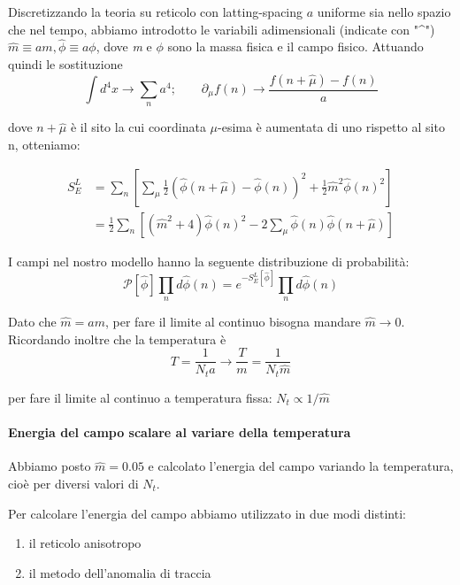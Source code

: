 \documentclass[a4paper, 12pt]{article}
\begin{document}
Discretizzando la teoria su reticolo con latting-spacing $a$ uniforme sia
nello spazio che nel tempo, abbiamo introdotto le variabili adimensionali
(indicate con "\^{}") $\hat{m} \equiv am, \hat{\phi} \equiv a \phi$,
dove \emph{m} e $\phi$ sono la massa fisica e il campo fisico.
Attuando quindi le sostituzione
\begin{equation}
\int d^4x \rightarrow \sum_n a^4; \qquad
\partial_{\mu}f(n) \rightarrow \frac{f(n+\hat{\mu}) - f(n)}{a}
\end{equation}

dove $n+\hat{\mu}$ è il sito la cui coordinata $\mu$-esima è aumentata di uno
rispetto al sito n, otteniamo:

\begin{align}
S_E^L &= \sum_n \left[ \sum_{\mu} \frac{1}{2} \left(\hat{\phi}(n+\hat{\mu})-
            \hat{\phi}(n) \right)^2 + \frac{1}{2} \hat{m}^2 \hat{\phi}(n)^2 \right] \\
      &= \frac{1}{2} \sum_n \left[ (\hat{m}^2 + 4) \hat{\phi}(n)^2 - 2 \sum_{\mu}
            \hat{\phi}(n)\hat{\phi}(n+\hat{\mu}) \right]
\end{align}

I campi nel nostro modello hanno la seguente distribuzione di probabilità:
\begin{equation}
\mathcal{P}[\hat{\phi}] \prod_n d \hat{\phi}(n) =
e^{-S_E^L[\hat{\phi}]} \prod_n d \hat{\phi}(n)
\end{equation}

Dato che $\hat{m} = am$, per fare il limite al continuo bisogna mandare
$\hat{m} \rightarrow 0$.
Ricordando inoltre che la temperatura è
\begin{equation}
T= \frac{1}{N_t a} \rightarrow \frac{T}{m} = \frac{1}{N_t \hat{m}}
\end{equation}

per fare il limite al continuo a temperatura fissa:
$N_t \propto 1/\hat{m}$

\paragraph{Energia del campo scalare al variare della temperatura}
Abbiamo posto $\hat{m}=0.05$ e calcolato l'energia del campo
variando la temperatura, cioè per diversi valori di $N_t$.

Per calcolare l'energia del campo abbiamo utilizzato in due modi distinti:
\begin{enumerate}
\item il reticolo anisotropo
\item il metodo dell'anomalia di traccia
\end{enumerate}
\end{document}

